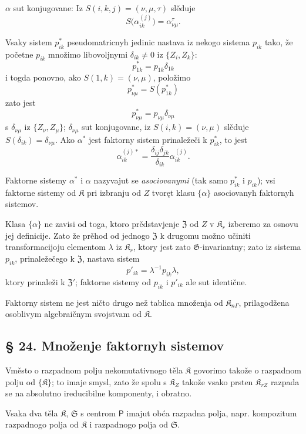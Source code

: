 \documentclass[11pt]{article}
\begin{document}
\(\alpha\) sut konjugovane: Iz \(S(i,k,j)=(\nu,\mu,\tau)\) slěduje
\[
S\bigl(\alpha_{ik}^{(j)}\bigr)=\alpha_{\nu\mu}^{\tau}.
\]

Vsaky sistem \(p_{ik}^*\) pseudomatricnyh jedinic nastava iz nekogo sistema \(p_{ik}\) tako, že početne \(p_{ik}\) množimo libovoljnymi \(\delta_{ik}\ne0\) iz \(\{Z_i,Z_k\}\):
\[
p_{1k}^*=p_{1k}\delta_{1k}
\]
i togda ponovno, ako \(S(1,k)=(\nu,\mu)\), položimo
\[
p_{\nu\mu}^*=S(p_{1k}^*)
\]
zato jest
\[
p_{\nu\mu}^*=p_{\nu\mu}\delta_{\nu\mu}
\]
s \(\delta_{\nu\mu}\) iz \(\{Z_\nu,Z_\mu\}\); \(\delta_{\nu\mu}\) sut konjugovane, iz \(S(i,k)=(\nu,\mu)\) slěduje \(S(\delta_{ik})=\delta_{\nu\mu}\). Ako \(\alpha^*\) jest faktorny sistem prinaležeči k \(p_{ik}^*\), to jest
\[
\alpha_{ik}^{(j)*}=\frac{\delta_{ij}\delta_{jk}}{\delta_{ik}}\alpha_{ik}^{(j)}.
\]

Faktorne sistemy \(\alpha^*\) i \(\alpha\) nazyvajut se \emph{asociovanymi} (tak samo \(p_{ik}^*\) i \(p_{ik}\)); vsi faktorne sistemy od \(\mathfrak K\) pri izbranju od \(Z\) tvoręt klasu \(\{\alpha\}\) asociovanyh faktornyh sistemov.

Klasa \(\{\alpha\}\) ne zavisi od toga, ktoro prědstavjenje \(\mathfrak Z\) od \(Z\) v \(\mathfrak K_r\) izberemo za osnovu jej definicije. Zato že prěhod od jednogo \(\mathfrak Z\) k drugomu možno učiniti transformacijoju elementom \(\lambda\) iz \(\mathfrak K_r\), ktory jest zato \(\mathfrak G\)-invariantny; zato iz sistema \(p_{ik}\), prinaležečego k \(\mathfrak Z\), nastava sistem
\[
p'_{ik}=\lambda^{-1}p_{ik}\lambda,
\]
ktory prinaleži k \(\mathfrak Z'\); faktorne sistemy od \(p_{ik}\) i \(p'_{ik}\) ale sut identične.

Faktorny sistem ne jest ničto drugo než tablica množenja od \(\mathfrak K_{n\Gamma}\), prilagodžena osoblivym algebraičnym svojstvam od \(\mathfrak K\).

\subsection*{§ 24. Množenje faktornyh sistemov}\label{multiplikation-von-faktorensystemen}

Vměsto o razpadnom polju nekomutativnogo těla \(\mathfrak K\) govorimo takože o razpadnom polju od \(\{\mathfrak K\}\); to imaje smysl, zato že spolu s \(\mathfrak K_Z\) takože vsako prsten \(\mathfrak K_{rZ}\) razpada se na absolutno ireducibilne komponenty, i obratno.

Vsaka dva těla \(\mathfrak K\), \(\mathfrak S\) s centrom \(\mathsf P\) imajut obća razpadna polja, napr. kompozitum razpadnogo polja od \(\mathfrak K\) i razpadnogo polja od \(\mathfrak S\).
\end{document}
